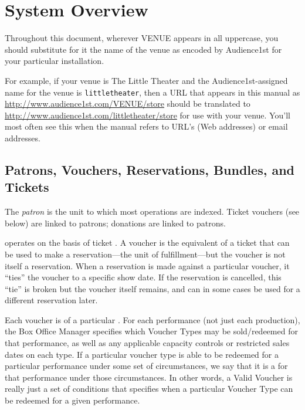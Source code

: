 \section{System Overview}

Throughout this document, wherever VENUE appears in all uppercase, you
should substitute for it the name of the venue as encoded by Audience1st
for your particular installation.

For example, if your venue is The Little Theater and the
Audience1st-assigned name for the venue is \verb+littletheater+, then a
URL that appears in this manual as
\url{http://www.audience1st.com/VENUE/store} should be translated to
\url{http://www.audience1st.com/littletheater/store} for use with your
venue.  You'll most often see this when the manual refers to URL's (Web
addresses) or email addresses.

\subsection{Patrons, Vouchers,  Reservations, Bundles, and Tickets}
\label{sec:overview-vouchers}

The \emph{patron} is the unit to which most operations are indexed.
Ticket vouchers (see below) are linked to
patrons; donations are linked to patrons.

\af operates on the basis of ticket . A voucher is the
equivalent of a ticket that can be used to make a reservation---the unit
of fulfillment---but the voucher is not itself a reservation.  When a
reservation is made against a particular voucher, it ``ties'' the
voucher to a specific show date.  If the reservation is cancelled, this
``tie'' is broken but the voucher itself remains, and can in some cases
be used for a different reservation later.

Each voucher is of a particular .  For each performance
(not just each production), the Box Office Manager specifies which
Voucher Types may be sold/redeemed for that performance, as well as any
applicable capacity controls or restricted sales dates on each type.  If
a particular voucher type is able to be redeemed for a particular
performance under some set of circumstances, we say that it is a
 for that performance under those circumstances.  In
other words, a Valid Voucher is really just a set of conditions that
specifies when a particular Voucher Type can be redeemed for a given
performance. 


